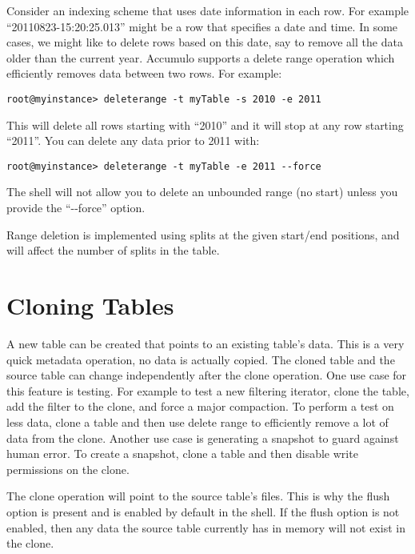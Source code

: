Consider an indexing scheme that uses date information in each row.
For example ``20110823-15:20:25.013'' might be a row that specifies a
date and time. In some cases, we might like to delete rows based on
this date, say to remove all the data older than the current year.
Accumulo supports a delete range operation which efficiently
removes data between two rows. For example:

\begingroup\fontsize{8pt}{8pt}\selectfont\begin{verbatim}
root@myinstance> deleterange -t myTable -s 2010 -e 2011
\end{verbatim}\endgroup

This will delete all rows starting with ``2010'' and it will stop at
any row starting ``2011''. You can delete any data prior to 2011
with:

\begingroup\fontsize{8pt}{8pt}\selectfont\begin{verbatim}
root@myinstance> deleterange -t myTable -e 2011 --force
\end{verbatim}\endgroup

The shell will not allow you to delete an unbounded range (no start)
unless you provide the ``-{}-force'' option.

Range deletion is implemented using splits at the given start/end
positions, and will affect the number of splits in the table.

\section{Cloning Tables}

A new table can be created that points to an existing table's data. This is a
very quick metadata operation, no data is actually copied. The cloned table
and the source table can change independently after the clone operation. One
use case for this feature is testing. For example to test a new filtering
iterator, clone the table, add the filter to the clone, and force a major
compaction. To perform a test on less data, clone a table and then use delete
range to efficiently remove a lot of data from the clone. Another use case is
generating a snapshot to guard against human error. To create a snapshot,
clone a table and then disable write permissions on the clone.

The clone operation will point to the source table's files. This is why the
flush option is present and is enabled by default in the shell. If the flush
option is not enabled, then any data the source table currently has in memory
will not exist in the clone.

